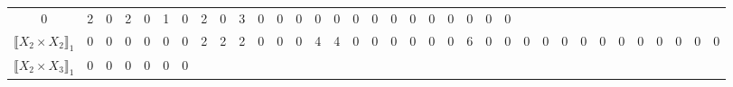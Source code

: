 \documentclass[12pt]{article}
\theoremstyle{definition}
\theoremstyle{remark}
\begin{document}
{\begin{table}[H]
\begin{adjustbox}{angle=90}
{\begin{tabular}{c||c|c|c|c|c|c|c|c|c|c|c|c|c|c|c|c|c|c|c|c|c|c|c|c|c|c|c|c|c|c|c|c|c|c}
0  & %
2  & %
0  & %
2  & %
0  & %
1  & %
0  & %
2  & %
0  & %
3  & %
0  & %
0  & %
0  & %
0  & %
0  & %
0  & %
0  & %
0  & %
0  & %
0  & %
0  & %
0  & %
0  & %
0   %
\\
$\llbracket X_2 \times X_2 \rrbracket_1$ &
0  & %
0  & %
0  & %
0  & %
0  & %
0  & %
2  & %
2  & %
2  & %
0  & %
0  & %
0  & %
4  & %
4  & %
0  & %
0  & %
0  & %
0  & %
0  & %
0  & %
6  & %
0  & %
0  & %
0  & %
0  & %
0  & %
0  & %
0  & %
0  & %
0  & %
0  & %
0  & %
0  & %
0   %
\\
$\llbracket X_2 \times X_3 \rrbracket_1$ &
0  & %
0  & %
0  & %
0  & %
0  & %
0  & %

\end{tabular}}
\end{adjustbox}
\end{table}}
\end{document}
